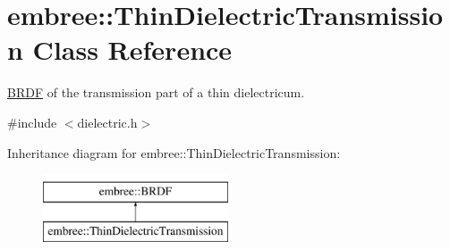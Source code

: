 \hypertarget{classembree_1_1_thin_dielectric_transmission}{
\section{embree::ThinDielectricTransmission Class Reference}
\label{classembree_1_1_thin_dielectric_transmission}
}


\hyperlink{classembree_1_1_b_r_d_f}{BRDF} of the transmission part of a thin dielectricum.  




{\ttfamily \#include $<$dielectric.h$>$}

Inheritance diagram for embree::ThinDielectricTransmission:\begin{figure}[H]
\begin{center}
\leavevmode
\includegraphics[height=2.000000cm]{classembree_1_1_thin_dielectric_transmission}
\end{center}
\end{figure}
